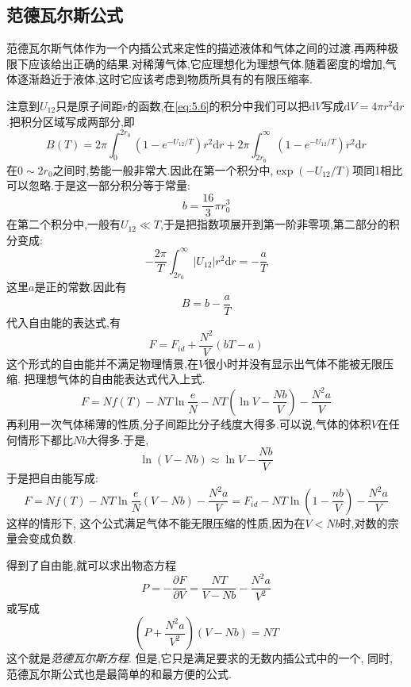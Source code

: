   



\subsection{范德瓦尔斯公式}
  范德瓦尔斯气体作为一个内插公式来定性的描述液体和气体之间的过渡.再两种极限下应该给出正确的结果.对稀薄气体,它应理想化为理想气体.随着密度的增加,气体逐渐趋近于液体,这时它应该考虑到物质所具有的有限压缩率.

  注意到$U_{12}$只是原子间距$r$的函数,在\eqref{eq:5.6}的积分中我们可以把$\mathrm{d} V$写成$\mathrm{d}  V= 4\pi r^{2}\mathrm{d} r$.把积分区域写成两部分,即
  \[B(T)=2\pi \int_{0}^{2r_0}(1-e^{-U_{12} / T})r^{2}\mathrm{d} r+2\pi\int_{2r_0}^{\infty} (1-e^{-U_{12} / T})r^{2} \mathrm{d}r\]
  在$0 \sim  2r_0$之间时,势能一般非常大.因此在第一个积分中,$\exp(- U_{12} /T)$项同1相比可以忽略.于是这一部分积分等于常量:
  \[b=\frac{16}{3}\pi r_0^{3}\]
  在第二个积分中,一般有$U_{12} \ll T$,于是把指数项展开到第一阶非零项,第二部分的积分变成:
  \[-\frac{2\pi}{T} \int_{2r_0}^{\infty} \left\vert U_{12} \right\vert r^{2} \mathrm{d}r=-\frac{a}{T}\]
  这里$a$是正的常数.因此有
  \[B=b-\frac{a}{T}\]
  代入自由能的表达式,有
  \[F=F_{id}+\frac{N^{2}}{V}(bT-a)\]
  这个形式的自由能并不满足物理情景,在$V$很小时并没有显示出气体不能被无限压缩. 把理想气体的自由能表达式代入上式.
  \[F=Nf(T)-NT \ln \frac{e}{N}-NT\left( \ln V-\frac{Nb}{V} \right) -\frac{N^{2}a}{V}\]
  再利用一次气体稀薄的性质,分子间距比分子线度大得多.可以说,气体的体积$V$在任何情形下都比$Nb$大得多.于是,
  \[\ln (V-Nb)\approx \ln V - \frac{Nb}{V}\]
  于是把自由能写成:
  \begin{equation}
    F=Nf(T)-NT \ln \frac{e}{N}(V-Nb)-\frac{N^{2}a}{V}=F_{id}-NT\ln(1-\frac{nb}{V})-\frac{N^{2}a}{V}
  \end{equation}
  这样的情形下, 这个公式满足气体不能无限压缩的性质,因为在$V<Nb$时,对数的宗量会变成负数.

  得到了自由能,就可以求出物态方程
  \begin{equation}
    P=-\dfrac{\partial F}{\partial V}=\frac{NT}{V-Nb}-\frac{N^{2}a}{V^{2}}
  \end{equation}
  或写成
  \begin{equation}
    \left( P+\frac{N^{2}a}{V^{2}} \right) (V-Nb)=NT
  \end{equation}
  这个就是\emph{范德瓦尔斯方程}. 但是,它只是满足要求的无数内插公式中的一个, 同时, 范德瓦尔斯公式也是最简单的和最方便的公式.
  
